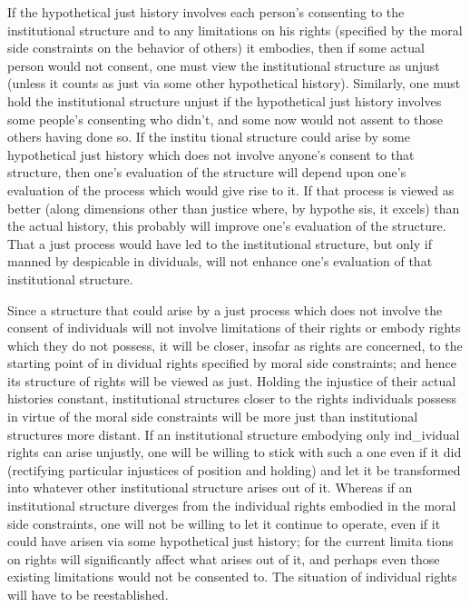 \documentclass[11pt,openany]{book}
\begin{document}
If the hypothetical just history involves each person's consenting to the institutional structure and to any limitations on his rights (specified by the moral side constraints on the behavior of others) it embodies, then if some actual person would not consent, one must view the institutional structure as unjust (unless it counts as just via some other hypothetical history). Similarly, one must hold the institutional structure unjust if the hypothetical just history involves some people's consenting who didn't, and some now would not assent to those others having done so. If the institu tional structure could arise by some hypothetical just history which does not involve anyone's consent to that structure, then one's evaluation of the structure will depend upon one's evaluation of the process which would give rise to it. If that process is viewed as better (along dimensions other than justice where, by hypothe sis, it excels) than the actual history, this probably will improve one's evaluation of the structure. That a just process would have led to the institutional structure, but only if manned by despicable in dividuals, will not enhance one's evaluation of that institutional structure. 

Since a structure that could arise by a just process which does not involve the consent of individuals will not involve limitations of their rights or embody rights which they do not possess, it will be closer, insofar as rights are concerned, to the starting point of in dividual rights specified by moral side constraints; and hence its structure of rights will be viewed as just. Holding the injustice of their actual histories constant, institutional structures closer to the rights individuals possess in virtue of the moral side constraints will be more just than institutional structures more distant. If an institutional structure embodying only ind\_ividual rights can arise unjustly, one will be willing to stick with such a one even if it did (rectifying particular injustices of position and holding) and let it be transformed into whatever other institutional structure arises out of it. Whereas if an institutional structure diverges from the individual rights embodied in the moral side constraints, one will not be willing to let it continue to operate, even if it could have arisen via some hypothetical just history; for the current limita tions on rights will significantly affect what arises out of it, and perhaps even those existing limitations would not be consented to. The situation of individual rights will have to be reestablished. 
\end{document}
